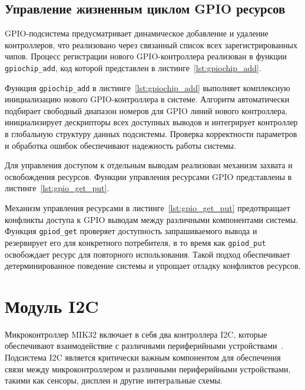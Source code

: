 \subsection{Управление жизненным циклом GPIO ресурсов}

GPIO-подсистема предусматривает динамическое добавление и удаление контроллеров, что реализовано через связанный список всех зарегистрированных чипов. Процесс регистрации нового GPIO-контроллера реализован в функции \texttt{gpiochip\_add}, код которой представлен в листинге~\ref{lst:gpiochip_add}.

\begin{listing}[H]
	\caption{Функция регистрации GPIO чипа}
	\label{lst:gpiochip_add}
\end{listing}

Функция \texttt{gpiochip\_add} в листинге~\ref{lst:gpiochip_add} выполняет комплексную инициализацию нового GPIO-контроллера в системе. Алгоритм автоматически подбирает свободный диапазон номеров для GPIO линий нового контроллера, инициализирует дескрипторы всех доступных выводов и интегрирует контроллер в глобальную структуру данных подсистемы. Проверка корректности параметров и обработка ошибок обеспечивают надежность работы системы.

Для управления доступом к отдельным выводам реализован механизм захвата и освобождения ресурсов. Функции управления ресурсами GPIO представлены в листинге~\ref{lst:gpio_get_put}.

\begin{listing}[H]
	\caption{Функции захвата и освобождения GPIO выводов}
	\label{lst:gpio_get_put}
\end{listing}

Механизм управления ресурсами в листинге~\ref{lst:gpio_get_put} предотвращает конфликты доступа к GPIO выводам между различными компонентами системы. Функция \texttt{gpiod\_get} проверяет доступность запрашиваемого вывода и резервирует его для конкретного потребителя, в то время как \texttt{gpiod\_put} освобождает ресурс для повторного использования. Такой подход обеспечивает детерминированное поведение системы и упрощает отладку конфликтов ресурсов.

\section{Модуль I2C}

Микроконтроллер MIK32 включает в себя два контроллера I2C, которые обеспечивают взаимодействие с различными периферийными устройствами~\cite{mik32_technical_spec}. Подсистема I2C является критически важным компонентом для обеспечения связи между микроконтроллером и различными периферийными устройствами, такими как сенсоры, дисплеи и другие интегральные схемы.

